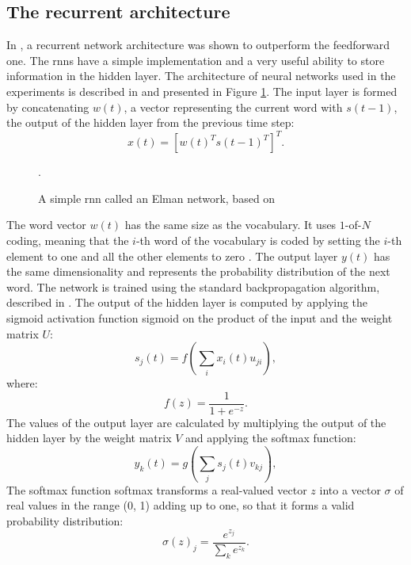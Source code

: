 	\subsection{The recurrent architecture}
	In \cite{mikolov2011extensions}, a recurrent network architecture was shown to outperform the feedforward one. The \glspl{rnn} have a simple implementation and a very useful ability to store information in the hidden layer. The architecture of neural networks used in the experiments is described in \cite{mikolov2010recurrent} and presented in Figure \ref{figure:recurrent}. The input layer is formed by concatenating $w(t)$, a vector representing the current word with $s(t-1)$, the output of the hidden layer from the previous time step:
	\begin{equation}
		x(t)=[w(t)^{T}s(t-1)^{T}]^{T}.
		\label{equation:word_vector}
	\end{equation}

	\begin{figure}[htbp]
		\centering
		
		\caption[A simple \gls{rnn}]{A simple \gls{rnn} called an Elman network, based on \cite{mikolov2011extensions}}.
		\label{figure:recurrent}
	\end{figure}
	The word vector $w(t)$ has the same size as the vocabulary. It uses \mbox{$1$-of-$N$} coding, meaning that the $i$-th word of the vocabulary is coded by setting the $i$-th element to one and all the other elements to zero \cite{schwenk2005training}. The output layer $y(t)$ has the same dimensionality and represents the probability distribution of the next word. The network is trained using the standard backpropagation algorithm, described in \cite{rumelhart1988learning}. The output of the hidden layer is computed by applying the sigmoid activation function \gls{sigmoid} on the product of the input and the weight matrix $U$:
	\begin{equation}
		s_{j}(t)=f(\sum_{i}x_{i}(t)u_{ji}),
		\label{equation:hidden}
	\end{equation}
where:
\begin{equation}
	f(z)=\frac{1}{1+e^{-z}}.
	\label{equation:sigmoid}
\end{equation}
The values of the output layer are calculated by multiplying the output of the hidden layer by the weight matrix $V$ and applying the softmax function:
\begin{equation}
	y_{k}(t)=g(\sum_{j}s_{j}(t)v_{kj}),
	\label{equation:output}
\end{equation}
The softmax function \gls{softmax} transforms a real-valued vector $z$ into a vector $\sigma$ of real values in the range (0, 1) adding up to one, so that it forms a valid probability distribution:
\begin{equation}
	\sigma(z)_{j}=\frac{e^{z_{j}}}{\sum_{k}e^{z_{k}}}.
	\label{equation:softmax}
\end{equation}

